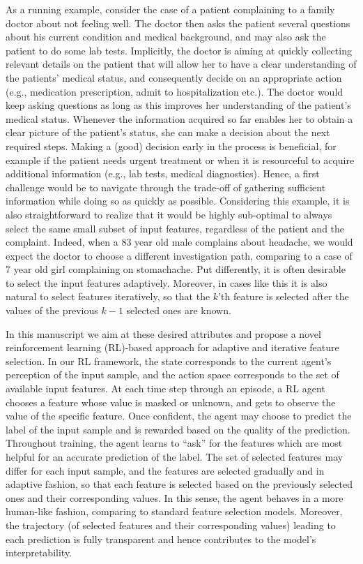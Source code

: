 \documentclass[reqno,11pt]{article}
\begin{document}
As a running example, consider the case of a patient complaining to a family doctor about not feeling well.
The doctor then asks the patient several questions about his current condition and medical background, and may also ask the patient to do some lab tests. 
Implicitly, the doctor is aiming at quickly collecting relevant details on the patient that will allow her to have a clear understanding of the patients' medical status, and consequently decide on an appropriate action (e.g., medication prescription, admit to hospitalization etc.).
The doctor would keep asking questions  as long as this improves her understanding of the patient's medical status. 
Whenever the information acquired so far enables her to obtain a clear picture of the patient's status, she can make a decision about the next required steps. 
Making a (good) decision early in the process is beneficial, for example if the patient needs urgent treatment or when it is resourceful to acquire additional information (e.g., lab tests, medical diagnostics).  
Hence, a first challenge would be to navigate through the trade-off of gathering sufficient information while doing so as quickly as possible. 
Considering this example, it is also straightforward to realize that it would be highly sub-optimal to always select the same small subset of input features, regardless of the patient and the complaint. 
Indeed, when a 83 year old male complains about headache, we would expect the doctor to choose a different investigation path, comparing to a case of 7 year old girl complaining on stomachache.  
Put differently, it is often desirable to select the input features adaptively.
Moreover, in cases like this it is also natural to select features iteratively, so that the $k$'th feature is selected after the values of the previous $k-1$ selected ones are known.

In this manuscript we aim at these desired attributes and propose a novel reinforcement learning (RL)-based approach for adaptive and iterative feature selection.
In our RL framework, the state corresponds to the current agent's perception of the input sample, and the action space corresponds to the set of available input features. At each time step through an episode, a RL agent chooses a feature whose value is masked or unknown, and gets to observe the value of the specific feature. Once confident, the agent may choose to predict the label of the input sample and is rewarded based on the quality of the prediction. 
Throughout training, the agent learns to ``ask'' for the features which are most helpful for an accurate prediction of the label.
The set of selected features may differ for each input sample, and the features are selected gradually and in adaptive fashion, so that each feature is selected based on the previously selected ones and their corresponding values.
In this sense, the agent behaves in a more human-like fashion, comparing to standard feature selection models.
Moreover, the trajectory (of selected features and their corresponding values) leading to each prediction is fully transparent and hence contributes to the model's interpretability.
\end{document}
